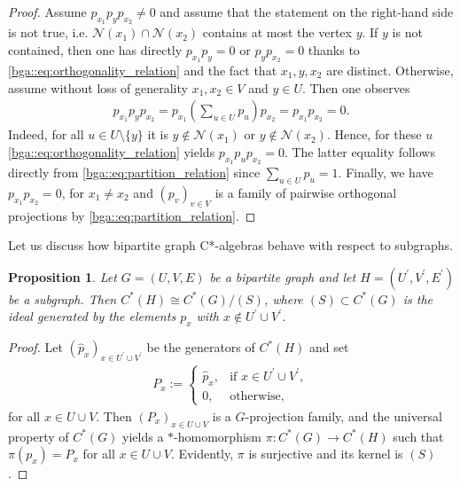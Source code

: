\documentclass[a4paper]{amsart}
\newtheorem{proposition}[thm]{Proposition}
\begin{document}
\begin{proof}
    Assume $p_{x_1} p_y p_{x_2} \neq 0$ and assume that the statement on the right-hand side is not true, i.e. $\mathcal{N}(x_1) \cap \mathcal{N}(x_2)$ contains at most the vertex $y$. If $y$ is not contained, then one has directly $p_{x_1} p_y = 0$ or $p_y p_{x_2} = 0$ thanks to \eqref{bga::eq:orthogonality_relation} and the fact that $x_1, y, x_2$ are distinct. Otherwise, assume without loss of generality $x_1, x_2 \in V$ and $y \in U$. Then one observes 
    \begin{align*}
        p_{x_1} p_y p_{x_2} = p_{x_1} \left( \sum_{u \in U} p_u \right) p_{x_2} = p_{x_1} p_{x_2}= 0.
    \end{align*}
    Indeed, for all $u \in U \setminus \{y\}$ it is $y \not \in \mathcal{N}(x_1)$ or $y \not \in \mathcal{N}(x_2)$. Hence, for these $u$ \eqref{bga::eq:orthogonality_relation} yields $p_{x_1} p_u p_{x_2} = 0$. The latter equality follows directly from \eqref{bga::eq:partition_relation} since $\sum_{u \in U} p_u = 1$. Finally, we have $p_{x_1} p_{x_2} = 0$, for $x_1 \neq x_2$ and $(p_v)_{v \in V}$ is a family of pairwise orthogonal projections by \eqref{bga::eq:partition_relation}.
\end{proof}

Let us discuss how bipartite graph C*-algebras behave with respect to subgraphs.

\begin{proposition}
    \label{bga::proposition:algebra_of_subgraphs}
    Let $G = (U, V, E)$ be a bipartite graph and let $H = (U^\prime, V^\prime, E^\prime)$ be a subgraph. Then $C^\ast(H) \cong C^\ast(G) / (S)$, where $(S) \subset C^\ast(G)$ is the ideal generated by the elements $p_x$ with $x \not \in U^\prime \cup V^\prime$.
\end{proposition}

\begin{proof}
    Let $(\hat{p}_x)_{x \in U^\prime \cup V^\prime}$ be the generators of $C^\ast(H)$ and set
    \begin{align*}
        P_x := \begin{cases}
            \hat{p}_x, &\text{if } x \in U^\prime \cup V^\prime, \\
            0,   &\text{otherwise},
            \end{cases}
    \end{align*}
    for all $x \in U \cup V$. Then $(P_x)_{x \in U \cup V}$ is a $G$-projection family, and the universal property of $C^\ast(G)$ yields a $\ast$-homomorphism $\pi: C^\ast(G) \to C^\ast(H)$ such that $\pi(p_x) = P_x$ for all $x \in U \cup V$. Evidently, $\pi$ is surjective and its kernel is $(S)$.
\end{proof}
\end{document}
